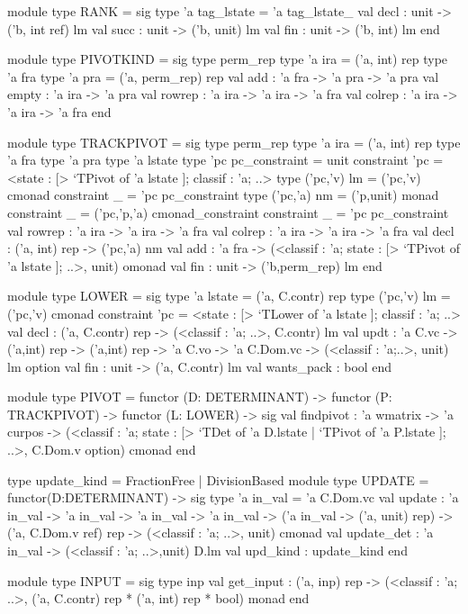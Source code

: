 \documentclass{elsart}
\begin{document}
\begin{code2}
module type RANK = sig
  type 'a tag_lstate = 'a tag_lstate_
  val decl   : unit -> ('b, int ref) lm
  val succ   : unit -> ('b, unit) lm
  val fin    : unit -> ('b, int) lm
end

module type PIVOTKIND = sig
  type perm_rep
  type 'a ira = ('a, int) rep
  type 'a fra
  type 'a pra = ('a, perm_rep) rep
  val add    : 'a fra -> 'a pra -> 'a pra
  val empty  : 'a ira -> 'a pra
  val rowrep : 'a ira -> 'a ira -> 'a fra
  val colrep : 'a ira -> 'a ira -> 'a fra
end

module type TRACKPIVOT = sig
  type perm_rep
  type 'a ira = ('a, int) rep
  type 'a fra   type 'a pra   type 'a lstate
  type 'pc pc_constraint = unit
    constraint 'pc = <state : [> `TPivot of 'a lstate ]; classif : 'a; ..>
  type ('pc,'v) lm = ('pc,'v) cmonad constraint _  = 'pc pc_constraint
  type ('pc,'a) nm = ('p,unit) monad
    constraint _ = ('pc,'p,'a) cmonad_constraint
    constraint _ = 'pc pc_constraint
  val rowrep : 'a ira -> 'a ira -> 'a fra
  val colrep : 'a ira -> 'a ira -> 'a fra
  val decl   : ('a, int) rep -> ('pc,'a) nm
  val add : 'a fra -> (<classif : 'a; state : [> `TPivot of 'a lstate ]; ..>, unit) omonad
  val fin    : unit -> ('b,perm_rep) lm
end

module type LOWER = sig
  type 'a lstate = ('a, C.contr) rep
  type ('pc,'v) lm = ('pc,'v) cmonad
    constraint 'pc = <state : [> `TLower of 'a lstate ]; classif : 'a; ..>
  val decl   : ('a, C.contr) rep -> (<classif : 'a; ..>, C.contr) lm
  val updt   : 'a C.vc -> ('a,int) rep -> ('a,int) rep -> 'a C.vo -> 
            'a C.Dom.vc -> (<classif : 'a;..>, unit) lm option
  val fin    : unit -> ('a,  C.contr) lm
  val wants_pack : bool
end

module type PIVOT = functor (D: DETERMINANT) -> functor (P: TRACKPIVOT) -> 
          functor (L: LOWER) -> sig
 val findpivot : 'a wmatrix -> 'a curpos -> 
   (<classif : 'a;  state : [> `TDet of 'a D.lstate | `TPivot of 'a P.lstate ]; ..>, 
    C.Dom.v option) cmonad
end

type update_kind = FractionFree | DivisionBased
module type UPDATE = functor(D:DETERMINANT) -> sig
  type 'a in_val = 'a C.Dom.vc
  val update :  'a in_val -> 'a in_val -> 'a in_val -> 'a in_val -> 
      ('a in_val -> ('a, unit) rep) -> ('a, C.Dom.v ref) rep -> 
      (<classif : 'a; ..>, unit) cmonad
  val update_det : 'a in_val -> (<classif : 'a; ..>,unit) D.lm
  val upd_kind : update_kind
end

module type INPUT = sig
  type inp
  val get_input : ('a, inp) rep ->
         (<classif : 'a; ..>, ('a, C.contr) rep * ('a, int) rep * bool) monad
end 
\end{code2}
\end{document}
